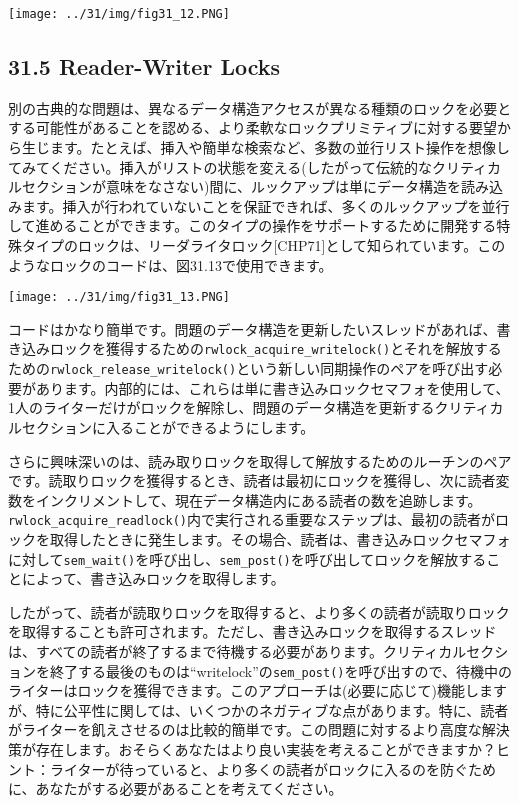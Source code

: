 \texttt{[image: ../31/img/fig31\_12.PNG]}

\hypertarget{reader-writer-locks}{%
\subsection*{31.5 Reader-Writer Locks}\label{reader-writer-locks}}

別の古典的な問題は、異なるデータ構造アクセスが異なる種類のロックを必要とする可能性があることを認める、より柔軟なロックプリミティブに対する要望から生じます。たとえば、挿入や簡単な検索など、多数の並行リスト操作を想像してみてください。挿入がリストの状態を変える(したがって伝統的なクリティカルセクションが意味をなさない)間に、ルックアップは単にデータ構造を読み込みます。挿入が行われていないことを保証できれば、多くのルックアップを並行して進めることができます。このタイプの操作をサポートするために開発する特殊タイプのロックは、リーダライタロック{[}CHP71{]}として知られています。このようなロックのコードは、図31.13で使用できます。

\texttt{[image: ../31/img/fig31\_13.PNG]}

コードはかなり簡単です。問題のデータ構造を更新したいスレッドがあれば、書き込みロックを獲得するための\texttt{rwlock\_acquire\_writelock()}とそれを解放するための\texttt{rwlock\_release\_writelock()}という新しい同期操作のペアを呼び出す必要があります。内部的には、これらは単に書き込みロックセマフォを使用して、1人のライターだけがロックを解除し、問題のデータ構造を更新するクリティカルセクションに入ることができるようにします。

さらに興味深いのは、読み取りロックを取得して解放するためのルーチンのペアです。読取りロックを獲得するとき、読者は最初にロックを獲得し、次に読者変数をインクリメントして、現在データ構造内にある読者の数を追跡します。\texttt{rwlock\_acquire\_readlock()}内で実行される重要なステップは、最初の読者がロックを取得したときに発生します。その場合、読者は、書き込みロックセマフォに対して\texttt{sem\_wait()}を呼び出し、\texttt{sem\_post()}を呼び出してロックを解放することによって、書き込みロックを取得します。

したがって、読者が読取りロックを取得すると、より多くの読者が読取りロックを取得することも許可されます。ただし、書き込みロックを取得するスレッドは、すべての読者が終了するまで待機する必要があります。クリティカルセクションを終了する最後のものは``writelock''の\texttt{sem\_post()}を呼び出すので、待機中のライターはロックを獲得できます。このアプローチは(必要に応じて)機能しますが、特に公平性に関しては、いくつかのネガティブな点があります。特に、読者がライターを飢えさせるのは比較的簡単です。この問題に対するより高度な解決策が存在します。おそらくあなたはより良い実装を考えることができますか？ヒント：ライターが待っていると、より多くの読者がロックに入るのを防ぐために、あなたがする必要があることを考えてください。

